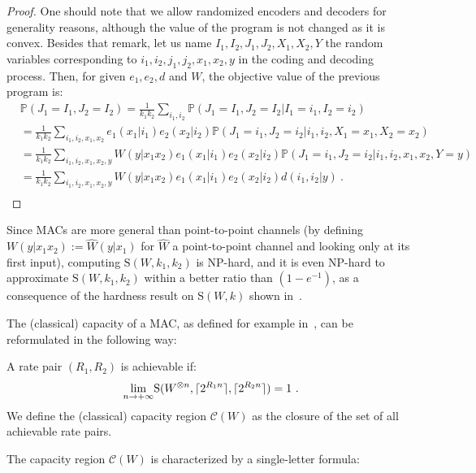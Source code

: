 \begin{proof}
One should note that we allow randomized encoders and decoders for generality reasons, although the value of the program is not changed as it is convex. Besides that remark, let us name $I_1,I_2,J_1,J_2,X_1,X_2,Y$ the random variables corresponding to $i_1,i_2,j_1,j_2,x_1,x_2,y$ in the coding and decoding process. Then, for given $e_1,e_2,d$ and $W$, the objective value of the previous program is:
\begin{equation}
  \begin{aligned}
    &\mathbb{P}\left(J_1 = I_1, J_2 = I_2\right) = \frac{1}{k_1k_2}\sum_{i_1,i_2} \mathbb{P}\left(J_1 = I_1, J_2 = I_2|I_1=i_1,I_2=i_2\right)\\
    &= \frac{1}{k_1k_2}\sum_{i_1,i_2,x_1,x_2}e_1(x_1|i_1)e_2(x_2|i_2) \mathbb{P}\left(J_1 = i_1, J_2 = i_2|i_1,i_2,X_1=x_1,X_2=x_2\right)\\
    &= \frac{1}{k_1k_2}\sum_{i_1,i_2,x_1,x_2,y}W(y|x_1x_2)e_1(x_1|i_1)e_2(x_2|i_2)\mathbb{P}\left(J_1 = i_1,J_2=i_2|i_1,i_2,x_1,x_2,Y=y\right)\\
    &= \frac{1}{k_1k_2}\sum_{i_1,i_2,x_1,x_2,y}W(y|x_1x_2)e_1(x_1|i_1)e_2(x_2|i_2)d(i_1,i_2|y) \ .\\
      \end{aligned}
\end{equation}
\end{proof}

Since MACs are more general than point-to-point channels (by defining $W(y|x_1x_2):=\hat{W}(y|x_1)$ for $\hat{W}$ a point-to-point channel and looking only at its first input), computing $\mathrm{S}(W,k_1,k_2)$ is \textrm{NP}-hard, and it is even \textrm{NP}-hard to approximate $\mathrm{S}(W,k_1,k_2)$ within a better ratio than $\left(1-e^{-1}\right)$, as a consequence of the hardness result on $\mathrm{S}(W,k)$ shown in~\cite{BF18}.

The (classical) capacity of a MAC, as defined for example in~\cite{CT01}, can be reformulated in the following way:
\begin{definition}
  A rate pair $(R_1,R_2)$ is achievable if:
  \[ \underset{n \rightarrow +\infty}{\lim} \mathrm{S}(W^{\otimes n},\lceil2^{R_1n}\rceil,\lceil2^{R_2n}\rceil) = 1 \ . \]
  We define the (classical) capacity region $\mathcal{C}(W)$ as the closure of the set of all achievable rate pairs.
\end{definition}

The capacity region $\mathcal{C}(W)$ is characterized by a single-letter formula:


